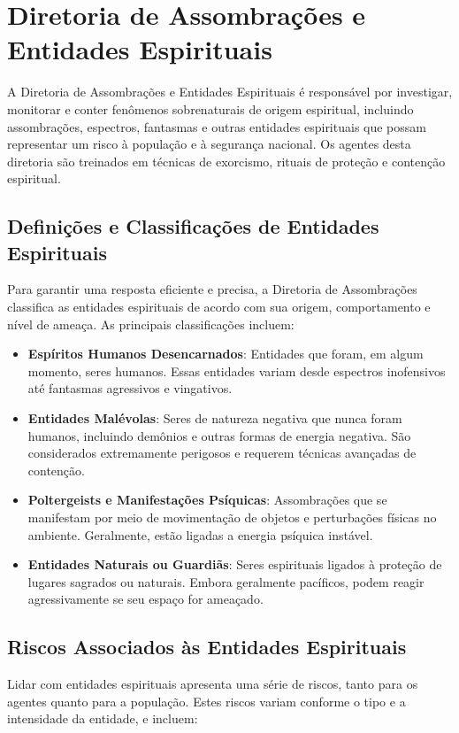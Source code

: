 \chapter{Diretoria de Assombrações e Entidades Espirituais}

A Diretoria de Assombrações e Entidades Espirituais é responsável por investigar, monitorar e conter fenômenos sobrenaturais de origem espiritual, incluindo assombrações, espectros, fantasmas e outras entidades espirituais que possam representar um risco à população e à segurança nacional. Os agentes desta diretoria são treinados em técnicas de exorcismo, rituais de proteção e contenção espiritual.

\section{Definições e Classificações de Entidades Espirituais}
Para garantir uma resposta eficiente e precisa, a Diretoria de Assombrações classifica as entidades espirituais de acordo com sua origem, comportamento e nível de ameaça. As principais classificações incluem:

\begin{itemize}
    \item \textbf{Espíritos Humanos Desencarnados}: Entidades que foram, em algum momento, seres humanos. Essas entidades variam desde espectros inofensivos até fantasmas agressivos e vingativos. 
    \item \textbf{Entidades Malévolas}: Seres de natureza negativa que nunca foram humanos, incluindo demônios e outras formas de energia negativa. São considerados extremamente perigosos e requerem técnicas avançadas de contenção.
    \item \textbf{Poltergeists e Manifestações Psíquicas}: Assombrações que se manifestam por meio de movimentação de objetos e perturbações físicas no ambiente. Geralmente, estão ligadas a energia psíquica instável.
    \item \textbf{Entidades Naturais ou Guardiãs}: Seres espirituais ligados à proteção de lugares sagrados ou naturais. Embora geralmente pacíficos, podem reagir agressivamente se seu espaço for ameaçado.
\end{itemize}

\section{Riscos Associados às Entidades Espirituais}
Lidar com entidades espirituais apresenta uma série de riscos, tanto para os agentes quanto para a população. Estes riscos variam conforme o tipo e a intensidade da entidade, e incluem:

